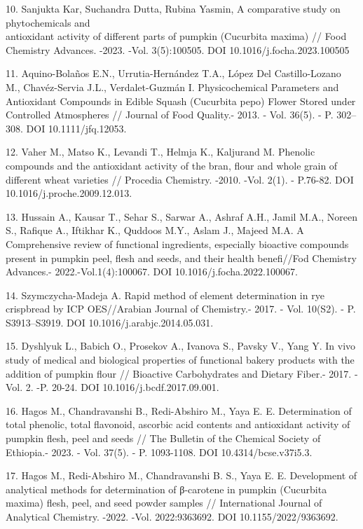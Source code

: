 \begin{references}
10.  Sanjukta Kar, Suchandra Dutta, Rubina Yasmin, A comparative study on
phytochemicals and \\antioxidant activity of different parts of pumpkin
(Cucurbita maxima) // Food Chemistry Advances. -2023. -Vol. 3(5):100505.
DOI 10.1016/j.focha.2023.100505

11.  Aquino-Bolaños E.N., Urrutia-Hernández T.A., López Del Castillo-Lozano
M., Chavéz-Servia J.L., Verdalet-Guzmán I. Physicochemical Parameters
and Antioxidant Compounds in Edible Squash (Cucurbita pepo) Flower
Stored under Controlled Atmospheres // Journal of Food Quality.- 2013.
- Vol. 36(5). - P. 302--308. DOI 10.1111/jfq.12053.

12.  Vaher M., Matso K., Levandi T., Helmja K., Kaljurand M. Phenolic
compounds and the antioxidant activity of the bran, flour and whole
grain of different wheat varieties // Procedia Chemistry. -2010. -Vol.
2(1). - P.76-82. DOI 10.1016/j.proche.2009.12.013.

13.  Hussain A., Kausar T., Sehar S., Sarwar A., Ashraf A.H., Jamil M.A.,
Noreen S., Rafique A., Iftikhar K., Quddoos M.Y., Aslam J., Majeed
M.A. A Comprehensive review of functional ingredients, especially
bioactive compounds present in pumpkin peel, flesh and seeds, and
their health benefi//Fod Chemistry Advances.- 2022.-Vol.1(4):100067.
DOI 10.1016/j.focha.2022.100067.

14.  Szymczycha-Madeja A. Rapid method of element determination in rye
crispbread by ICP OES//Arabian Journal of Chemistry.- 2017. - Vol.
10(S2). - P. S3913--S3919.
DOI 10.1016/j.arabjc.2014.05.031.

15.  Dyshlyuk L., Babich O., Prosekov A., Ivanova S., Pavsky V., Yang Y. In
vivo study of medical and biological properties of functional bakery
products with the addition of pumpkin flour // Bioactive Carbohydrates
and Dietary Fiber.- 2017. -Vol. 2. -P. 20-24.
DOI 10.1016/j.bcdf.2017.09.001.

16.  Hagos M., Chandravanshi B., Redi-Abshiro M., Yaya E. E. Determination
of total phenolic, total flavonoid, ascorbic acid contents and
antioxidant activity of pumpkin flesh, peel and seeds // The Bulletin
of the Chemical Society of Ethiopia.- 2023. - Vol. 37(5). - P.
1093-1108.
DOI 10.4314/bcse.v37i5.3.

17.  Hagos M., Redi-Abshiro M., Chandravanshi B. S., Yaya E. E. Development
of analytical methods for determination of β-carotene in pumpkin
(Cucurbita maxima) flesh, peel, and seed powder samples //
International Journal of Analytical Chemistry. -2022. -Vol.
2022:9363692.
DOI 10.1155/2022/9363692.


\end{references}
